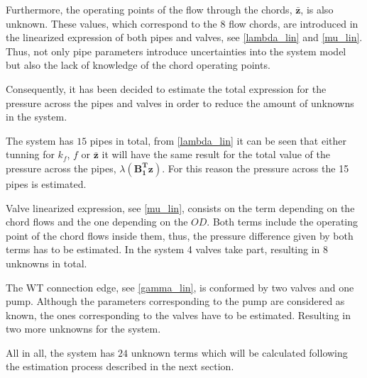 %


Furthermore, the operating points of the flow through the chords, $\pmb{\bar{z}}$, is also unknown. These values, which correspond to the $8$ flow chords, are introduced in the linearized expression of both pipes 
and valves, see \eqref{lambda_lin} and \eqref{mu_lin}. Thus, not only pipe parameters introduce uncertainties into the system model but also the lack of knowledge of the chord operating points.

Consequently, it has been decided to estimate the total expression for the pressure across the pipes and valves in order to reduce the amount of unknowns in the system.

The system has $15$ pipes in total,  from \eqref{lambda_lin} it can be seen that either tunning for $k_f$, $f$ or $\pmb{\bar{z}}$ it will have the same result for the total
value of the pressure across the pipes, $\lambda(\pmb{{B_1^{T}}}\pmb{z})$. For this reason the pressure across the 15 pipes is estimated.

Valve linearized expression, see \eqref{mu_lin}, consists on the term depending on the chord flows and the one depending on the $OD$. Both terms include the operating 
point of the chord flows inside them, thus, the pressure difference given by both terms has to be estimated. In the system 4 valves take part, 
resulting in 8 unknowns in total. 

The WT connection edge, see \eqref{gamma_lin}, is conformed by two valves and one pump. Although the parameters corresponding to the pump are considered as known, the ones 
corresponding to the valves have to be estimated. Resulting in two more unknowns for the system. 

All in all, the system has $24$ unknown terms which will be calculated following the estimation process described in the next section.